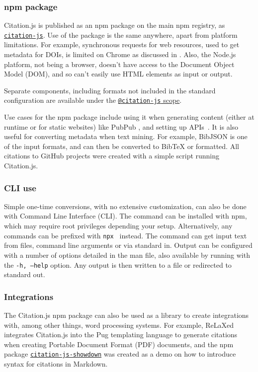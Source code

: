 \documentclass[fleqn,10pt,lineno]{wlpeerj} %
\begin{document}
\subsubsection*{npm package}

Citation.js is published as an npm package on the main npm registry, as \href{https://npm.im/citation-js}{\texttt{citation-js}}. Use of the package is the same anywhere, apart from platform limitations. For example, synchronous requests for web resources, used to get metadata for DOIs, is limited on Chrome as discussed in \cite{willighagen_make_2017}. Also, the Node.js platform, not being a browser, doesn't have access to the Document Object Model (DOM), and so can't easily use HTML elements as input or output.

Separate components, including formats not included in the standard configuration are available under the \href{https://www.npmjs.com/org/citation-js}{\texttt{@citation-js} scope}.

Use cases for the npm package include using it when generating content (either at runtime or for static websites) like PubPub \citep{shihipar_pubpub:_2018}, and setting up APIs~\citep{willighagen_citation.js:_2017}. It is also useful for converting metadata when text mining. For example, BibJSON is one of the input formats, and can then be converted to BibTeX or formatted. All citations to GitHub projects were created with a simple script running Citation.js.

\subsubsection*{CLI use}

Simple one-time conversions, with no extensive customization, can also be done with Command Line Interface (CLI). The command can be installed with npm, which may require root privileges depending your setup. Alternatively, any commands can be prefixed with \texttt{npx } instead. The command can get input text from files, command line arguments or via standard in. Output can be configured with a number of options detailed in the man file, also available by running with the \texttt{-h, --help} option. Any output is then written to a file or redirected to standard out.

\subsubsection*{Integrations}

The Citation.js npm package can also be used as a library to create integrations with, among other things, word processing systems. For example, ReLaXed \citep{null2018RelaxedJS/ReLaXed} integrates Citation.js into the Pug templating language to generate citations when creating Portable Document Format (PDF) documents, and the npm package \href{https://npm.im/citation-js-showdown}{\texttt{citation-js-showdown}} was created as a demo on how to introduce syntax for citations in Markdown.
\end{document}
